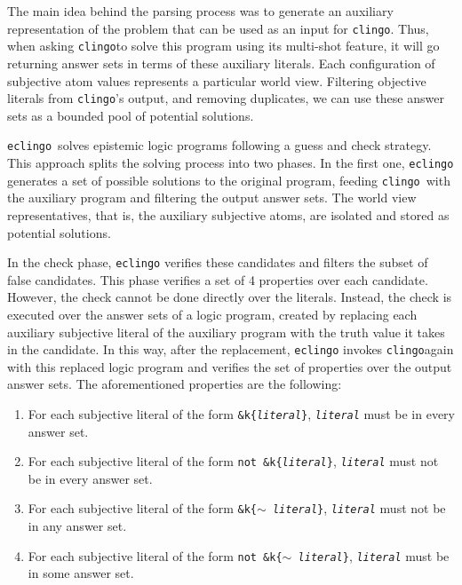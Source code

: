 \documentclass{new_tlp}
\def\eclingo{{\tt eclingo}}
\def\clingo{{\tt clingo}}
\begin{document}
The main idea behind the parsing process was to generate an auxiliary representation of the problem that can be used as an input for \clingo. Thus, when asking \clingo to solve this program using its multi-shot feature, it will go returning answer sets in terms of these auxiliary literals. Each configuration of subjective atom values represents a particular world view. Filtering objective literals from \clingo's output, and removing duplicates, we can use these answer sets as a bounded pool of potential solutions.

\eclingo\ solves epistemic logic programs following a guess and check strategy. This approach splits the solving process into two phases. In the first one, \eclingo{} generates a set of possible solutions to the original program, feeding \clingo\ with the auxiliary program and filtering the output answer sets. The world view representatives, that is, the auxiliary subjective atoms, are isolated and stored as potential solutions.

In the check phase, \eclingo{} verifies these candidates and filters the subset of false candidates.
This phase verifies a set of 4 properties over each candidate. However, the check cannot be done directly over the literals. Instead, the check is executed over the answer sets of a logic program, created by replacing each auxiliary subjective literal of the auxiliary program with the truth value it takes in the candidate. In this way, after the replacement, \eclingo{} invokes \clingo again with this replaced logic program and verifies the set of properties over the output answer sets. The aforementioned properties are the following:
\begin{enumerate}
    \item For each subjective literal of the form \texttt{\&k\{\emph{literal}\}}, \texttt{\emph{literal}} must be in every answer set.

    \item For each subjective literal of the form \texttt{not \&k\{\emph{literal}\}}, \texttt{\emph{literal}} must not be in every answer set.

    \item For each subjective literal of the form \texttt{\&k\{$\sim$ \emph{literal}\}}, \texttt{\emph{literal}} must not be in any answer set.

    \item For each subjective literal of the form \texttt{not \&k\{$\sim$ \emph{literal}\}}, \texttt{\emph{literal}} must be in some answer set.
\end{enumerate}
\end{document}
